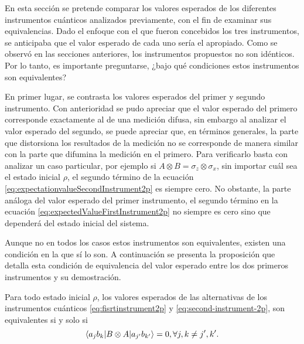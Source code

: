 En esta sección se pretende comparar los valores esperados de los diferentes instrumentos cuánticos analizados previamente, con el fin de examinar sus equivalencias.  Dado el enfoque con el que fueron concebidos los tres instrumentos, se anticipaba que el valor esperado de cada uno sería el apropiado. Como se observó en las secciones anteriores, los instrumentos propuestos no son idénticos. Por lo tanto, es importante preguntarse, ¿bajo qué condiciones estos instrumentos son equivalentes?






En primer lugar, se contrasta los valores esperados del primer y segundo instrumento. Con anterioridad se pudo apreciar que el valor esperado del primero corresponde exactamente al de una medición difusa, sin embargo al analizar el valor esperado del segundo, se puede apreciar que, en términos generales, la parte que distorsiona los resultados de la medición no se corresponde de manera similar con la parte que difumina la medición en el primero. Para verificarlo basta con analizar un caso particular, por ejemplo si $A\otimes B= \sigma_z\otimes \sigma_x$, sin importar cuál sea el estado inicial $\rho$, el segundo término de  la ecuación {\eqref{eq:expectationvalueSecondInstrument2p}} es siempre cero. No obstante, la parte análoga del valor esperado del primer instrumento, el segundo término en la ecuación {\eqref{eq:expectedValueFirstInstrument2p}} no siempre es cero  sino que dependerá del estado inicial del sistema.  


Aunque no en todos los casos estos instrumentos son equivalentes, existen una condición en la que sí lo son. A continuación se presenta la proposición que detalla esta condición de equivalencia del valor esperado entre los dos primeros instrumentos y su demostración.


\begin{proposition}\label{prop:Equivalencia-instruments1-2}
    Para todo estado inicial $\rho$, los valores esperados de las alternativas de los instrumentos cuánticos {\eqref{eq:fisrtinstrument2p}} y {\eqref{eq:second-instrument-2p}}, son equivalentes si y solo si \[\langle a_j b_k|B\otimes A|a_{j'}b_{k'}\rangle=0, \forall j,k\ne j',k'.\]
\end{proposition}

